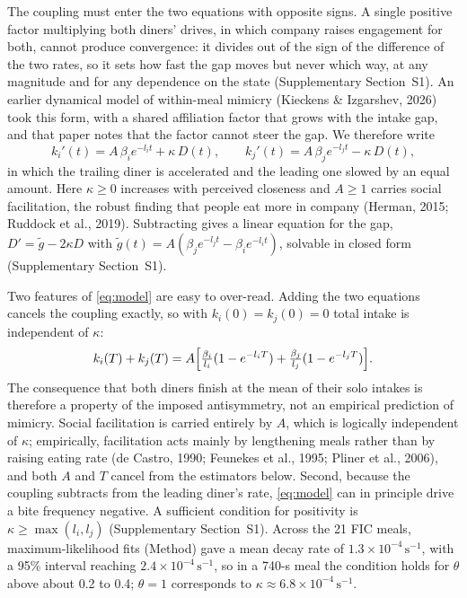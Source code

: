 \documentclass[12pt]{article}
\newcommand{\ki}{k_i}
\newcommand{\kj}{k_j}
\begin{document}
The coupling must enter the two equations with opposite signs. A single positive
factor multiplying both diners' drives, in which company raises engagement for
both, cannot produce convergence: it divides out of the sign of the difference of
the two rates, so it sets how fast the gap moves but never which way, at any
magnitude and for any dependence on the state (Supplementary Section~S1). An
earlier dynamical model of within-meal mimicry (Kieckens \& Izgarshev, 2026) took
this form, with a shared affiliation factor that grows with the intake gap, and
that paper notes that the factor cannot steer the gap. We therefore write
\begin{equation}\label{eq:model}
\ki'(t)=A\,\beta_i e^{-l_i t}+\kappa\,D(t),
\qquad
\kj'(t)=A\,\beta_j e^{-l_j t}-\kappa\,D(t),
\end{equation}
in which the trailing diner is accelerated and the leading one slowed by an equal
amount. Here $\kappa\geq0$ increases with perceived closeness and $A\geq1$ carries
social facilitation, the robust finding that people eat more in company (Herman,
2015; Ruddock et al., 2019). Subtracting gives a linear
equation for the gap, $D'=\tilde g-2\kappa D$ with
$\tilde g(t)=A(\beta_j e^{-l_j t}-\beta_i e^{-l_i t})$, solvable in closed form
(Supplementary Section~S1).

Two features of \eqref{eq:model} are easy to over-read. Adding the two equations
cancels the coupling exactly, so with $\ki(0)=\kj(0)=0$ total intake is
independent of $\kappa$:
\begin{equation}\label{eq:conservation}
\ki(T)+\kj(T)=A\Bigl[\tfrac{\beta_i}{l_i}(1-e^{-l_iT})+\tfrac{\beta_j}{l_j}(1-e^{-l_jT})\Bigr].
\end{equation}
The consequence that both diners finish at the mean of their solo
intakes is therefore a property of the imposed antisymmetry, not an empirical
prediction of mimicry. Social facilitation is carried entirely by $A$, which is
logically independent of $\kappa$; empirically, facilitation acts mainly by
lengthening meals rather than by raising eating rate (de Castro, 1990; Feunekes et al., 1995; Pliner et al., 2006), and both
$A$ and $T$ cancel from the estimators below. Second, because the coupling
subtracts from the leading diner's rate, \eqref{eq:model} can in principle drive a
bite frequency negative. A sufficient condition for positivity is
$\kappa\geq\max(l_i,l_j)$ (Supplementary Section~S1). Across the 21 FIC meals,
maximum-likelihood fits (Method) gave a mean decay rate of $1.3\times10^{-4}\,\mathrm{s}^{-1}$, with a
95\% interval reaching $2.4\times10^{-4}\,\mathrm{s}^{-1}$, so in a 740-s meal the
condition holds for $\theta$ above about 0.2 to 0.4;
$\theta=1$ corresponds to $\kappa\approx6.8\times10^{-4}\,\mathrm{s}^{-1}$.
\end{document}
